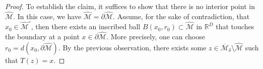 \documentclass[11pt]{amsart}%
\theoremstyle{plain}
\newcommand{\N}{{\mathbb N}}
\def\ria{\rightarrow}
\newcommand{\1}{\mathbf{1}}
\newcommand{\M}{\mathcal{M}}
\begin{document}
\begin{proof}

    To establish the claim, it suffices to show that there is no interior point in $\widehat{\M}$. In this case, we have $\widehat{\M} =\partial \widehat{\M}$. Assume, for the sake of contradiction, that $x_0 \in \widehat{\M}^\circ$, then there exists an inscribed ball $B(x_0, r_0)\subset \widehat{\M}$ in $\mathbb{R}^D$ that touches the boundary at a point $x\in \partial \widehat{\M}$. More precisely, one can choose $r_0=d(x_0, \partial \widehat{\M})$. By the previous observation, there exists some $z \in \overline{\M}_\delta \setminus \widehat{\M}$ such that $T(z)=x$. 


\end{proof}
\end{document}
